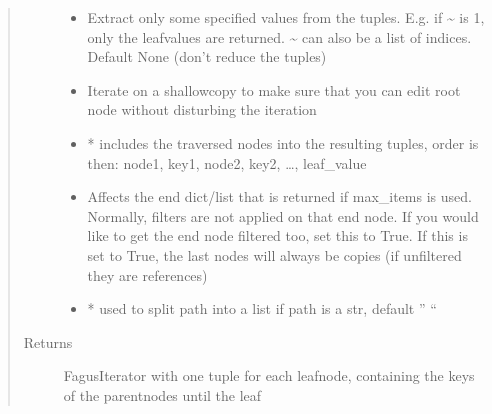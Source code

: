 \documentclass[a4paper,10pt,english]{sphinxmanual}
\begin{document}
\begin{fulllineitems}
\begin{fulllineitems}
\begin{quote}
\begin{description}
\begin{itemize}
\item {}
\sphinxAtStartPar
{} \textendash{} Extract only some specified values from the tuples. E.g. if \textasciitilde{} is \sphinxhyphen{}1, only the leaf\sphinxhyphen{}values are
returned. \textasciitilde{} can also be a list of indices. Default None (don’t reduce the tuples)

\item {}
\sphinxAtStartPar
{} \textendash{} Iterate on a shallow\sphinxhyphen{}copy to make sure that you can edit root node without disturbing the iteration

\item {}
\sphinxAtStartPar
{} \textendash{} * includes the traversed nodes into the resulting tuples, order is then:
node1, key1, node2, key2, …, leaf\_value

\item {}
\sphinxAtStartPar
{} \textendash{} Affects the end dict/list that is returned if max\_items is used. Normally, filters are not
applied on that end node. If you would like to get the end node filtered too, set this to True. If this
is set to True, the last nodes will always be copies (if unfiltered they are references)

\item {}
\sphinxAtStartPar
{} \textendash{} * used to split path into a list if path is a str, default ” “

\end{itemize}

\item[{Returns}] \leavevmode
\sphinxAtStartPar
FagusIterator with one tuple for each leaf\sphinxhyphen{}node, containing the keys of the parent\sphinxhyphen{}nodes until the leaf

\end{description}\end{quote}

\end{fulllineitems}



\end{fulllineitems}
\end{document}
